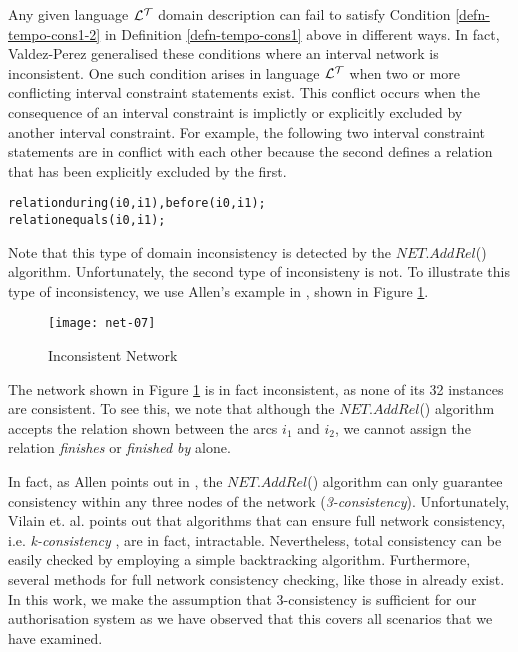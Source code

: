 \documentclass[11pt]{report}
\newenvironment{vverbatim}
{
  \begin{alltt}
}
{
    \vspace{-\baselineskip}
  \end{alltt}
}
\begin{document}
      Any given language ${\cal L^T}$ domain description can fail to satisfy
      Condition \ref{defn-tempo-cons1-2} in Definition \ref{defn-tempo-cons1}
      above in different ways. In fact, Valdez-Perez \cite{VAL} generalised
      these conditions where an interval network is inconsistent\footnotemark.
      One such condition arises in language ${\cal L^T}$ when two or more
      conflicting interval constraint statements exist. This conflict occurs
      when the consequence of an interval constraint is implictly or explicitly
      excluded by another interval constraint. For example, the following two
      interval constraint statements are in conflict with each other because
      the second defines a relation that has been explicitly excluded by the
      first.

      \begin{vverbatim}
  relation during(i0, i1), before(i0, i1);
  relation equals(i0, i1);
      \end{vverbatim}

      Note that this type of domain inconsistency is detected by the
      $NET.AddRel$() algorithm. Unfortunately, the second type of inconsisteny
      is not. To illustrate this type of inconsistency, we use Allen's example
      in \cite{ALE}, shown in Figure \ref{figu-tempo-ntwk7}.

      \begin{figure}[tbhp]
        \begin{center}
          \texttt{[image: net-07]}
          \caption{Inconsistent Network}
          \label{figu-tempo-ntwk7}
        \end{center}
      \end{figure}

      The network shown in Figure \ref{figu-tempo-ntwk7} is in fact
      inconsistent, as none of its 32 instances are consistent. To see this, we
      note that although the $NET.AddRel$() algorithm accepts the relation
      shown between the arcs $i_1$ and $i_2$, we cannot assign the relation
      {\em finishes} or {\em finished by} alone.

      In fact, as Allen points out in \cite{ALE}, the $NET.AddRel$() algorithm
      can only guarantee consistency within any three nodes of the network
      ({\em 3-consistency}). Unfortunately, Vilain et. al. \cite{VIL} points
      out that algorithms that can ensure full network consistency, i.e.
      {\em k-consistency} \cite{FRE}, are in fact, intractable. Nevertheless,
      total consistency can be easily checked by employing a simple
      backtracking algorithm. Furthermore, several methods for full network
      consistency checking, like those in \cite{LAD,VAN} already exist. In this
      work, we make the assumption that 3-consistency is sufficient for our
      authorisation system as we have observed that this covers all scenarios
      that we have examined.
\end{document}
